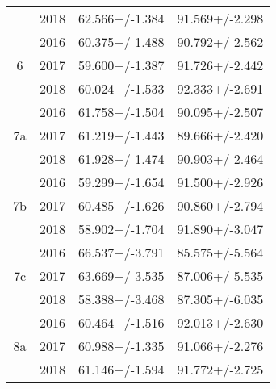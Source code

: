 \begin{table}
\begin{tabular}{cccc}
   & 2018 &       62.566+/-1.384 &        91.569+/-2.298 \\
\cline{1-4}
\multirow{3}{*}{6} & 2016 &       60.375+/-1.488 &        90.792+/-2.562 \\
   & 2017 &       59.600+/-1.387 &        91.726+/-2.442 \\
   & 2018 &       60.024+/-1.533 &        92.333+/-2.691 \\
\cline{1-4}
\multirow{3}{*}{7a} & 2016 &       61.758+/-1.504 &        90.095+/-2.507 \\
   & 2017 &       61.219+/-1.443 &        89.666+/-2.420 \\
   & 2018 &       61.928+/-1.474 &        90.903+/-2.464 \\
\cline{1-4}
\multirow{3}{*}{7b} & 2016 &       59.299+/-1.654 &        91.500+/-2.926 \\
   & 2017 &       60.485+/-1.626 &        90.860+/-2.794 \\
   & 2018 &       58.902+/-1.704 &        91.890+/-3.047 \\
\cline{1-4}
\multirow{3}{*}{7c} & 2016 &       66.537+/-3.791 &        85.575+/-5.564 \\
   & 2017 &       63.669+/-3.535 &        87.006+/-5.535 \\
   & 2018 &       58.388+/-3.468 &        87.305+/-6.035 \\
\cline{1-4}
\multirow{3}{*}{8a} & 2016 &       60.464+/-1.516 &        92.013+/-2.630 \\
   & 2017 &       60.988+/-1.335 &        91.066+/-2.276 \\
   & 2018 &       61.146+/-1.594 &        91.772+/-2.725 \\
\bottomrule
\end{tabular}
\end{table}
